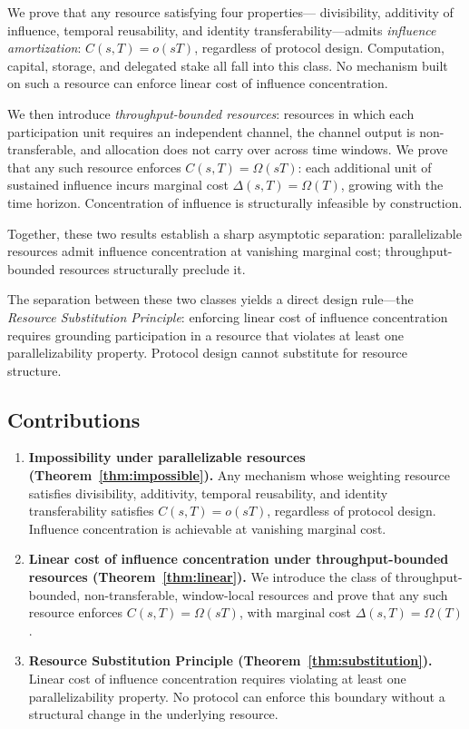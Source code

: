 \documentclass[10pt,journal,compsoc]{IEEEtran}
\theoremstyle{remark}
\begin{document}
	We prove that any resource satisfying four properties---
	divisibility, additivity of influence, temporal reusability,
	and identity transferability---admits \emph{influence
		amortization}: $C(s,T) = o(sT)$, regardless of protocol
	design.
	Computation, capital, storage, and delegated stake all
	fall into this class.
	No mechanism built on such a resource can enforce linear
	cost of influence concentration.
	
	We then introduce \emph{throughput-bounded resources}:
	resources in which each participation unit requires an
	independent channel, the channel output is non-transferable,
	and allocation does not carry over across time windows.
	We prove that any such resource enforces
	$C(s,T) = \Omega(sT)$: each additional unit of sustained
	influence incurs marginal cost $\Delta(s,T) = \Omega(T)$,
	growing with the time horizon.
	Concentration of influence is structurally infeasible
	by construction.
	
	Together, these two results establish a sharp asymptotic
	separation: parallelizable resources admit influence
	concentration at vanishing marginal cost; throughput-bounded
	resources structurally preclude it.
	
	The separation between these two classes yields a direct
	design rule---the \emph{Resource Substitution Principle}:
	enforcing linear cost of influence concentration requires
	grounding participation in a resource that violates at
	least one parallelizability property.
	Protocol design cannot substitute for resource structure.
	
	\subsection{Contributions}
	\label{ssec:contributions}
	
	\begin{enumerate}
		
		\item \textbf{Impossibility under parallelizable resources
			(Theorem~\ref{thm:impossible}).}
		Any mechanism whose weighting resource satisfies
		divisibility, additivity, temporal reusability, and
		identity transferability satisfies $C(s,T) = o(sT)$,
		regardless of protocol design.
		Influence concentration is achievable at vanishing
		marginal cost.
		
		\item \textbf{Linear cost of influence concentration under
			throughput-bounded resources (Theorem~\ref{thm:linear}).}
		We introduce the class of throughput-bounded,
		non-transferable, window-local resources and prove
		that any such resource enforces $C(s,T) = \Omega(sT)$,
		with marginal cost $\Delta(s,T) = \Omega(T)$.
		
		\item \textbf{Resource Substitution Principle
			(Theorem~\ref{thm:substitution}).}
		Linear cost of influence concentration requires
		violating at least one parallelizability property.
		No protocol can enforce this boundary without a
		structural change in the underlying resource.
		
	\end{enumerate}
	
\end{document}
